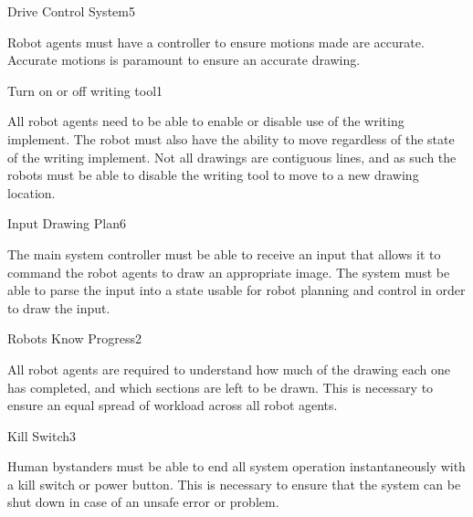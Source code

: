 {\begin{functional_requirement}{Drive Control System}{5}
\label{fr:drive_control}
\item Robot agents must have a controller to ensure motions made are accurate. Accurate motions is paramount to ensure an accurate drawing.  
\end{functional_requirement}

\begin{functional_requirement}{Turn on or off writing tool}{1}
\label{fr:on_tool}
\item All robot agents need to be able to enable or disable use of the writing implement. The robot must also have the ability to move regardless of the state of the writing implement. Not all drawings are contiguous lines, and as such the robots must be able to disable the writing tool to move to a new drawing location.
\end{functional_requirement}

\begin{functional_requirement}{Input Drawing Plan}{6}
\label{fr:input_plan}
\item The main system controller must be able to receive an input that allows it to command the robot agents to draw an appropriate image. The system must be able to parse the input into a state usable for robot planning and control in order to draw the input. 
\end{functional_requirement}

\begin{functional_requirement}{Robots Know Progress}{2}
\label{fr:know_progress}
\item All robot agents are required to understand how much of the drawing each one has completed, and which sections are left to be drawn. This is necessary to ensure an equal spread of workload across all robot agents. 
\end{functional_requirement}

\begin{functional_requirement}{Kill Switch}{3}
\label{fr:kill_switch}
\item Human bystanders must be able to end all system operation instantaneously with a kill switch or power button. This is necessary to ensure that the system can be shut down in case of an unsafe error or problem. 
\end{functional_requirement}

}
